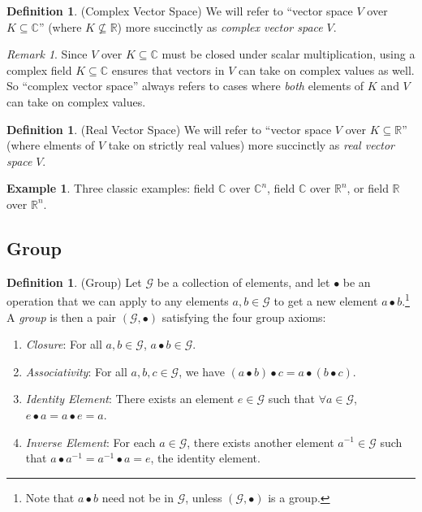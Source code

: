 \documentclass[12pt]{article}
\numberwithin{equation}{section} %
\theoremstyle{plain}
\theoremstyle{definition}
\newtheorem{defn}[thm]{Definition}
\newtheorem{ex}[thm]{Example}
\theoremstyle{remark}
\newtheorem*{rmk}{Remark}
\newcommand{\calG}{\mathcal{G}}
\newcommand{\R}{\mathbb{R}}
\newcommand{\Rn}{\mathbb{R}^n}
\newcommand{\C}{\mathbb{C}}
\newcommand{\Cn}{\mathbb{C}^n}
\begin{document}
\begin{defn}(Complex Vector Space)
We will refer to ``vector space $V$ over $K\subseteq\C$'' (where
$K\not\subseteq\R$) more succinctly as \emph{complex vector space} $V$.
\end{defn}

\begin{rmk}
Since $V$ over $K\subseteq\C$ must be closed under scalar
multiplication, using a complex field $K\subseteq\C$ ensures that
vectors in $V$ can take on complex values as well. So ``complex vector
space'' always refers to cases where \emph{both} elements of $K$ and $V$
can take on complex values.
\end{rmk}

\begin{defn}(Real Vector Space)
We will refer to ``vector space $V$ over $K\subseteq\R$'' (where elments
of $V$ take on strictly real values) more succinctly as
\emph{real vector space} $V$.
\end{defn}

\begin{ex}
Three classic examples: field $\C$ over $\Cn$, field $\C$ over $\Rn$, or
field $\R$ over $\Rn$.
\end{ex}


\clearpage
\subsection{Group}

\begin{defn}(Group)
Let $\calG$ be a collection of elements, and let $\bullet$ be an
operation that we can apply to any elements $a,b\in\calG$ to get a new
element $a\bullet b$.\footnote{%
  Note that $a\bullet b$ need not be in $\calG$, unless
  $(\calG,\bullet)$ is a group.
}
A \emph{group} is then a pair $(\calG,\bullet)$ satisfying the four
group axioms:
\begin{enumerate}[label=(\roman*)]
  \item \emph{Closure}: For all $a,b\in\calG$, $a\bullet b\in\calG$.
  \item \emph{Associativity}:
    For all $a,b,c\in\calG$,
    we have $(a\bullet b)\bullet c= a\bullet (b\bullet c)$.
  \item \emph{Identity Element}:
    There exists an element $e\in\calG$ such that $\forall a\in\calG$,
    $e\bullet a=a\bullet e= a$.
  \item \emph{Inverse Element}:
    For each $a\in\calG$, there exists another element $a^{-1}\in\calG$
    such that $a\bullet a^{-1}=a^{-1}\bullet a=e$, the identity element.
\end{enumerate}
\end{defn}
\end{document}
